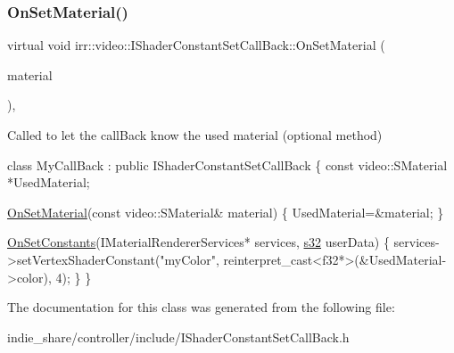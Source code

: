 \subsubsection{\texorpdfstring{On\+Set\+Material()}{OnSetMaterial()}\hspace{0.1cm}{\footnotesize\ttfamily [2/2]}}
{\footnotesize\ttfamily virtual void irr\+::video\+::\+I\+Shader\+Constant\+Set\+Call\+Back\+::\+On\+Set\+Material (\begin{DoxyParamCaption}\item[{const \hyperlink{classirr_1_1video_1_1SMaterial}{S\+Material} \&}]{material }\end{DoxyParamCaption})\hspace{0.3cm}{\ttfamily [inline]}, {\ttfamily [virtual]}}



Called to let the call\+Back know the used material (optional method) 


\begin{DoxyCode}
\textcolor{keyword}{class }MyCallBack : \textcolor{keyword}{public} IShaderConstantSetCallBack
\{
    \textcolor{keyword}{const} video::SMaterial *UsedMaterial;

    \hyperlink{classirr_1_1video_1_1IShaderConstantSetCallBack_a837ad9419ca4c17b011af75bb24e7a72}{OnSetMaterial}(\textcolor{keyword}{const} video::SMaterial& material)
    \{
        UsedMaterial=&material;
    \}

    \hyperlink{classirr_1_1video_1_1IShaderConstantSetCallBack_a91cf4eb8d20d278defaca4e3c9390396}{OnSetConstants}(IMaterialRendererServices* services, \hyperlink{namespaceirr_ac66849b7a6ed16e30ebede579f9b47c6}{s32} userData)
    \{
        services->setVertexShaderConstant(\textcolor{stringliteral}{"myColor"}, reinterpret\_cast<f32*>(&UsedMaterial->color), 4);
    \}
\}
\end{DoxyCode}
 

The documentation for this class was generated from the following file\+:\begin{DoxyCompactItemize}
\item 
indie\+\_\+share/controller/include/I\+Shader\+Constant\+Set\+Call\+Back.\+h\end{DoxyCompactItemize}
